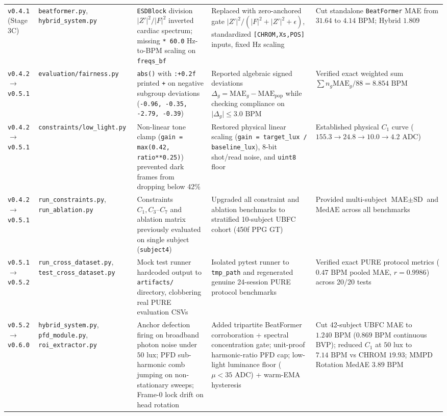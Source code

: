 \documentclass[conference]{IEEEtran}
\begin{document}
\begin{table}[t]
{\begin{tabular}{@{}lllll@{}}
\texttt{v0.4.1} (Stage 3C) & \texttt{beatformer.py}, \texttt{hybrid\_system.py} & \texttt{ESDBlock} division $\lvert Z'\rvert^2/\lvert F\rvert^2$ inverted cardiac spectrum; missing \texttt{* 60.0} Hz-to-BPM scaling on \texttt{freqs\_bf} & Replaced with zero-anchored gate $\lvert Z'\rvert^2/(\lvert F\rvert^2+\lvert Z'\rvert^2+\epsilon)$, standardized \texttt{[CHROM,Xs,POS]} inputs, fixed Hz scaling & Cut standalone \texttt{BeatFormer} MAE from $31.64$ to $4.14\text{ BPM}$; Hybrid $1.809$ \\
\texttt{v0.4.2} $\to$ \texttt{v0.5.1} & \texttt{evaluation/fairness.py} & \texttt{abs()} with \texttt{:+0.2f} printed \texttt{+} on negative subgroup deviations (\texttt{-0.96, -0.35, -2.79, -0.39}) & Reported algebraic signed deviations $\Delta_g = \text{MAE}_g - \text{MAE}_{\text{pop}}$ while checking compliance on $\lvert\Delta_g\rvert \le 3.0\text{ BPM}$ & Verified exact weighted sum $\sum n_g\text{MAE}_g/88 = 8.854\text{ BPM}$ \\
\texttt{v0.4.2} $\to$ \texttt{v0.5.1} & \texttt{constraints/low\_light.py} & Non-linear tone clamp (\texttt{gain = max(0.42, ratio**0.25)}) prevented dark frames from dropping below 42\% & Restored physical linear scaling (\texttt{gain = target\_lux / baseline\_lux}), 8-bit shot/read noise, and \texttt{uint8} floor & Established physical $C_1$ curve ($155.3 \to 24.8 \to 10.0 \to 4.2\text{ ADC}$) \\
\texttt{v0.4.2} $\to$ \texttt{v0.5.1} & \texttt{run\_constraints.py}, \texttt{run\_ablation.py} & Constraints $C_1, C_3\text{--}C_7$ and ablation matrix previously evaluated on single subject (\texttt{subject4}) & Upgraded all constraint and ablation benchmarks to stratified 10-subject UBFC cohort (450f PPG GT) & Provided multi-subject $\text{MAE}\pm\text{SD}$ and $\text{MedAE}$ across all benchmarks \\
\texttt{v0.5.1} $\to$ \texttt{v0.5.2} & \texttt{run\_cross\_dataset.py}, \texttt{test\_cross\_dataset.py} & Mock test runner hardcoded output to \texttt{artifacts/} directory, clobbering real PURE evaluation CSVs & Isolated pytest runner to \texttt{tmp\_path} and regenerated genuine 24-session PURE protocol benchmarks & Verified exact PURE protocol metrics ($0.47\text{ BPM}$ pooled MAE, $r = 0.9986$) across 20/20 tests \\
\texttt{v0.5.2} $\to$ \texttt{v0.6.0} & \texttt{hybrid\_system.py}, \texttt{pfd\_module.py}, \texttt{roi\_extractor.py} & Anchor defection firing on broadband photon noise under $50\text{ lux}$; PFD sub-harmonic comb jumping on non-stationary sweeps; Frame-0 lock drift on head rotation & Added tripartite BeatFormer corroboration + spectral concentration gate; unit-proof harmonic-ratio PFD cap; low-light luminance floor ($\mu < 35\text{ ADC}$) + warm-EMA hysteresis & Cut 42-subject UBFC MAE to $1.240\text{ BPM}$ ($0.869\text{ BPM}$ continuous BVP); reduced $C_1$ at $50\text{ lux}$ to $7.14\text{ BPM}$ vs CHROM $19.93$; MMPD Rotation MedAE $3.89\text{ BPM}$ \\

\end{tabular}}
\end{table}
\end{document}

